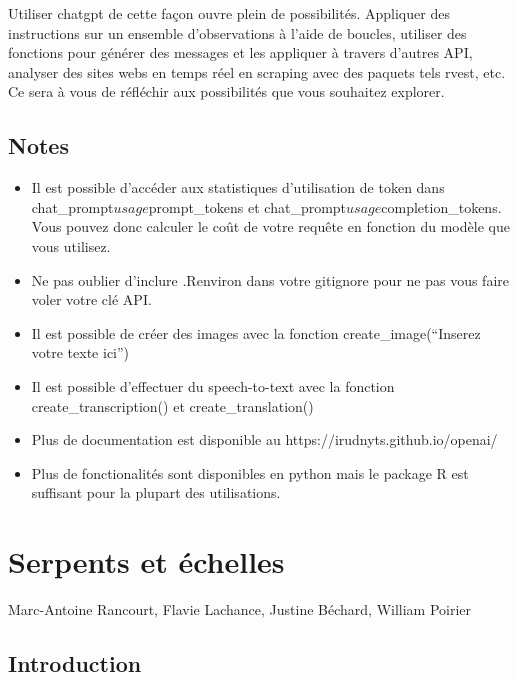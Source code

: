\documentclass[
  letterpaper,
]{scrbook}
\begin{document}
Utiliser chatgpt de cette façon ouvre plein de possibilités. Appliquer
des instructions sur un ensemble d'observations à l'aide de boucles,
utiliser des fonctions pour générer des messages et les appliquer à
travers d'autres API, analyser des sites webs en temps réel en scraping
avec des paquets tels rvest, etc. Ce sera à vous de réfléchir aux
possibilités que vous souhaitez explorer.

\hypertarget{notes}{%
\section{Notes}\label{notes}}

\begin{itemize}
\item
  Il est possible d'accéder aux statistiques d'utilisation de token dans
  chat\_prompt\(usage\)prompt\_tokens et
  chat\_prompt\(usage\)completion\_tokens. Vous pouvez donc calculer le
  coût de votre requête en fonction du modèle que vous utilisez.
\item
  Ne pas oublier d'inclure .Renviron dans votre gitignore pour ne pas
  vous faire voler votre clé API.
\item
  Il est possible de créer des images avec la fonction
  create\_image(``Inserez votre texte ici'')
\item
  Il est possible d'effectuer du speech-to-text avec la fonction
  create\_transcription() et create\_translation()
\item
  Plus de documentation est disponible au
  https://irudnyts.github.io/openai/
\item
  Plus de fonctionalités sont disponibles en python mais le package R
  est suffisant pour la plupart des utilisations.
\end{itemize}


\hypertarget{serpents-et-uxe9chelles}{%
\chapter{Serpents et échelles}\label{serpents-et-uxe9chelles}}

\begin{center}

Marc-Antoine Rancourt, Flavie Lachance, Justine Béchard, William Poirier

\end{center}

\hypertarget{introduction-2}{%
\section{Introduction}\label{introduction-2}}
\end{document}
